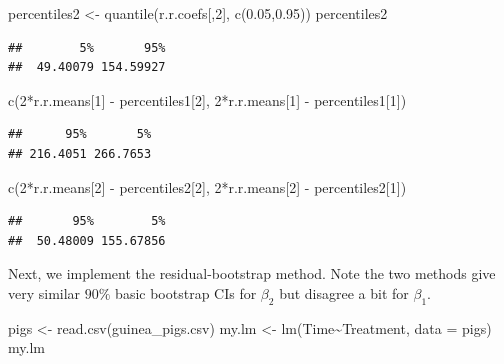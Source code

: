 \documentclass[
]{book}
\newenvironment{Shaded}{\begin{snugshade}}{\end{snugshade}}
\newcommand{\AttributeTok}[1]{\textcolor[rgb]{0.77,0.63,0.00}{#1}}
\newcommand{\DecValTok}[1]{\textcolor[rgb]{0.00,0.00,0.81}{#1}}
\newcommand{\FloatTok}[1]{\textcolor[rgb]{0.00,0.00,0.81}{#1}}
\newcommand{\FunctionTok}[1]{\textcolor[rgb]{0.00,0.00,0.00}{#1}}
\newcommand{\NormalTok}[1]{#1}
\newcommand{\OtherTok}[1]{\textcolor[rgb]{0.56,0.35,0.01}{#1}}
\newcommand{\SpecialCharTok}[1]{\textcolor[rgb]{0.00,0.00,0.00}{#1}}
\newcommand{\StringTok}[1]{\textcolor[rgb]{0.31,0.60,0.02}{#1}}
\begin{document}
\begin{Shaded}
\begin{Highlighting}[]
\NormalTok{percentiles2 }\OtherTok{\textless{}{-}} \FunctionTok{quantile}\NormalTok{(r.r.coefs[,}\DecValTok{2}\NormalTok{], }\FunctionTok{c}\NormalTok{(}\FloatTok{0.05}\NormalTok{,}\FloatTok{0.95}\NormalTok{))}
\NormalTok{percentiles2}
\end{Highlighting}
\end{Shaded}

\begin{verbatim}
##        5%       95% 
##  49.40079 154.59927
\end{verbatim}

\begin{Shaded}
\begin{Highlighting}[]
\FunctionTok{c}\NormalTok{(}\DecValTok{2}\SpecialCharTok{*}\NormalTok{r.r.means[}\DecValTok{1}\NormalTok{] }\SpecialCharTok{{-}}\NormalTok{ percentiles1[}\DecValTok{2}\NormalTok{], }\DecValTok{2}\SpecialCharTok{*}\NormalTok{r.r.means[}\DecValTok{1}\NormalTok{] }\SpecialCharTok{{-}}\NormalTok{ percentiles1[}\DecValTok{1}\NormalTok{])}
\end{Highlighting}
\end{Shaded}

\begin{verbatim}
##      95%       5% 
## 216.4051 266.7653
\end{verbatim}

\begin{Shaded}
\begin{Highlighting}[]
\FunctionTok{c}\NormalTok{(}\DecValTok{2}\SpecialCharTok{*}\NormalTok{r.r.means[}\DecValTok{2}\NormalTok{] }\SpecialCharTok{{-}}\NormalTok{ percentiles2[}\DecValTok{2}\NormalTok{], }\DecValTok{2}\SpecialCharTok{*}\NormalTok{r.r.means[}\DecValTok{2}\NormalTok{] }\SpecialCharTok{{-}}\NormalTok{ percentiles2[}\DecValTok{1}\NormalTok{])}
\end{Highlighting}
\end{Shaded}

\begin{verbatim}
##       95%        5% 
##  50.48009 155.67856
\end{verbatim}

Next, we implement the residual-bootstrap method. Note the two methods give very similar \(90\%\) basic bootstrap CIs for \(\beta_2\) but disagree a bit for \(\beta_1\).

\begin{Shaded}
\begin{Highlighting}[]
\NormalTok{pigs }\OtherTok{\textless{}{-}} 
\FunctionTok{read.csv}\NormalTok{(}\StringTok{\textquotesingle{}guinea\_pigs.csv\textquotesingle{}}\NormalTok{)}
\NormalTok{my.lm }\OtherTok{\textless{}{-}} \FunctionTok{lm}\NormalTok{(Time}\SpecialCharTok{\textasciitilde{}}\NormalTok{Treatment, }\AttributeTok{data =}\NormalTok{ pigs)}
\NormalTok{my.lm}
\end{Highlighting}
\end{Shaded}
\end{document}
